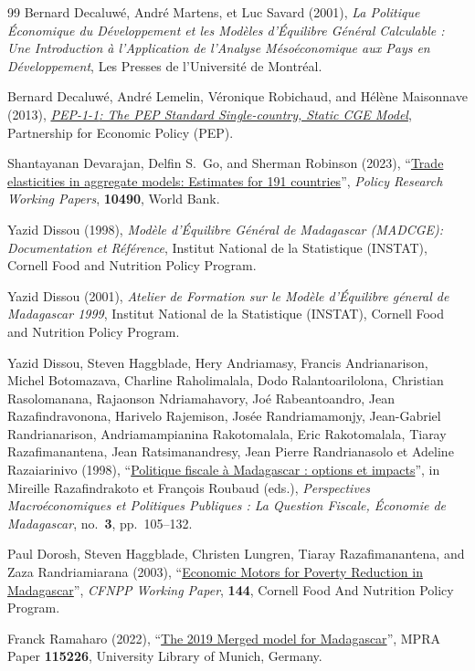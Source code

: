 \documentclass[11pt,a4paper]{article}
\begin{document}
	\newpage
	\begin{thebibliography}{99}	
		\setlength{\itemsep}{0.25cm}
		Bernard Decaluwé, André Martens, et Luc Savard (2001), \textit{La Politique Économique du Développement et les Modèles d'Équilibre Général Calculable : Une Introduction à l'Application de l'Analyse Mésoéconomique aux Pays en Développement}, Les Presses de l'Université de Montréal.
		
		
		Bernard Decaluwé, André Lemelin, Véronique Robichaud, and Hélène Maisonnave (2013), \href{https://www.pep-net.org/research-resources/cge-models}{\textit{{PEP-1-1}: The PEP Standard Single-country, Static CGE Model}}, Partnership for Economic Policy (PEP).
		
		Shantayanan Devarajan, Delfin S.~Go, and Sherman Robinson (2023), ``\href{http://hdl.handle.net/10986/39981}{Trade elasticities in aggregate models: Estimates for 191 countries}'', \textit{Policy Research Working Papers}, \textbf{10490}, World Bank. 
		
		
		Yazid Dissou (1998), \textit{Modèle d'Équilibre Général de Madagascar (MADCGE): Documentation et Référence}, Institut National de la Statistique (INSTAT), Cornell Food and Nutrition Policy Program.
		
		Yazid Dissou (2001), \textit{Atelier de Formation sur le Modèle d'Équilibre géneral de Madagascar 1999}, Institut National de la Statistique (INSTAT), Cornell Food and Nutrition Policy Program.
		
		Yazid Dissou, Steven Haggblade, Hery Andriamasy, Francis Andrianarison, Michel Botomazava, Charline Raholimalala, Dodo Ralantoarilolona, Christian Rasolomanana, Rajaonson Ndriamahavory, Joé Rabeantoandro, Jean Razafindravonona, Harivelo Rajemison, Josée Randriamamonjy, Jean-Gabriel Randrianarison, Andriamampianina Rakotomalala, Eric Rakotomalala, Tiaray Razafimanantena, Jean Ratsimanandresy, Jean Pierre Randrianasolo et Adeline Razaiarinivo (1998), ``\href{https://www.documentation.ird.fr/hor/fdi:010019178}{Politique fiscale à Madagascar : options et impacts}'', in Mireille Razafindrakoto et François Roubaud (eds.), \textit{Perspectives Macroéconomiques et Politiques Publiques : La Question Fiscale, Économie de Madagascar}, no.~\textbf{3}, pp.~105--132. 
		
		
		Paul Dorosh, Steven Haggblade, Christen Lungren, Tiaray Razafimanantena, and Zaza Randriamiarana (2003), ``\href{https://www.cfnpp.cornell.edu/images/wp144en.pdf}{Economic Motors for Poverty Reduction in Madagascar}'', \textit{CFNPP Working Paper}, \textbf{144}, Cornell Food And Nutrition Policy Program.
		
		 Franck Ramaharo (2022), ``\href{https://mpra.ub.uni-muenchen.de/id/eprint/115226}{The 2019 Merged model for Madagascar}'', MPRA Paper \textbf{115226}, University Library of Munich, Germany. 
	\end{thebibliography}	
	
\end{document}
